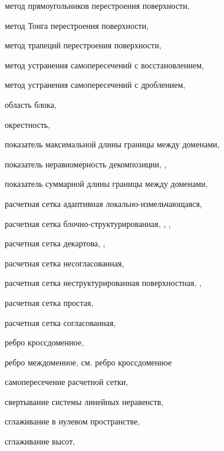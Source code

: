 метод прямоугольников перестроения поверхности, \pageref{term:method_remesh_rect}

метод Тонга перестроения поверхности, \pageref{term:method_remesh_tong}

метод трапеций перестроения поверхности, \pageref{term:method_remesh_trap}

метод устранения самопересечений с восстановлением, \pageref{term:method_selfint_repare}

метод устранения самопересечений с дроблением, \pageref{term:method_selfint_cut}

область блока, \pageref{term:block_scope}

окрестность, \pageref{term:okrestnost}

показатель максимальной длины границы между доменами, \pageref{term:decomp_maxbord}

показатель неравномерность декомпозиции, \pageref{term:decomp_neravn}, \pageref{term:decomp_neravn2}

показатель суммарной длины границы между доменами, \pageref{term:decomp_sumbord}

расчетная сетка адаптивная локально-измельчающаяся, \pageref{term:mesh_adaptive}

расчетная сетка блочно-структурированная, \pageref{term:mesh_block_struct}, \pageref{term:mesh_block_struct2}, \pageref{term:mesh_block_struct3}

расчетная сетка декартова, \pageref{term:mesh_descartes}, \pageref{term:mesh_descartes2}

расчетная сетка несогласованная, \pageref{term:mesh_nesoglas}

расчетная сетка неструктурированная поверхностная, \pageref{term:unstruct_surf_calc_mesh}, \pageref{term:unstruct_surf_calc_mesh2}

расчетная сетка простая, \pageref{term:mesh_simple}

расчетная сетка согласованная, \pageref{term:mesh_soglas}

ребро кроссдоменное, \pageref{term:edge_cross}

ребро междоменное, см. ребро кроссдоменное

самопересечение расчетной сетки, \pageref{term:mesh_self_intersect}

свертывание системы линейных неравенств, \pageref{term:method_svert_sys_neravenstv}

сглаживание в нулевом пространстве, \pageref{term:smooth_null}

сглаживание высот, \pageref{term:smooth_height}

